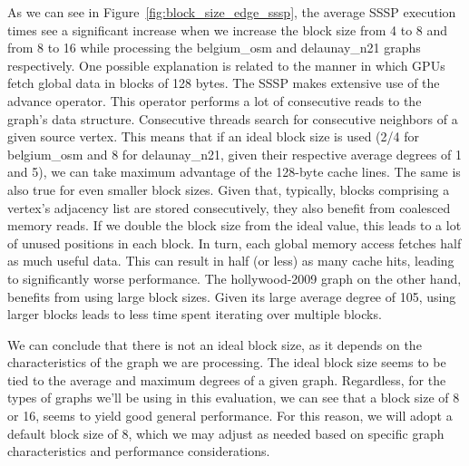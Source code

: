 As we can see in Figure~\ref{fig:block_size_edge_sssp}, the average \gls{SSSP} execution times see a significant increase when we increase the block size from 4 to 8 and from 8 to 16 while processing the belgium\_osm and delaunay\_n21 graphs respectively. One possible explanation is related to the manner in which \gls{GPU}s fetch global data in blocks of 128 bytes. The \gls{SSSP} makes extensive use of the advance operator. This operator performs a lot of consecutive reads to the graph's data structure. Consecutive threads search for consecutive neighbors of a given source vertex. This means that if an ideal block size is used (2/4 for belgium\_osm and 8 for delaunay\_n21, given their respective average degrees of 1 and 5), we can take maximum advantage of the 128-byte cache lines. The same is also true for even smaller block sizes. Given that, typically, blocks comprising a vertex's adjacency list are stored consecutively, they also benefit from coalesced memory reads. If we double the block size from the ideal value, this leads to a lot of unused positions in each block. In turn, each global memory access fetches half as much useful data. This can result in half (or less) as many cache hits, leading to significantly worse performance. The hollywood-2009 graph on the other hand, benefits from using large block sizes. Given its large average degree of 105, using larger blocks leads to less time spent iterating over multiple blocks.

We can conclude that there is not an ideal block size, as it depends on the characteristics of the graph we are processing. The ideal block size seems to be tied to the average and maximum degrees of a given graph. Regardless, for the types of graphs we'll be using in this evaluation, we can see that a block size of 8 or 16, seems to yield good general performance. For this reason, we will adopt a default block size of 8, which we may adjust as needed based on specific graph characteristics and performance considerations.










